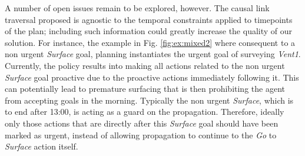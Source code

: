 A number of open issues remain to be explored, however. The causal
link traversal proposed is agnostic to the temporal constraints
applied to timepoints of the plan; including such information could
greatly increase the quality of our solution.  
For instance, the example in Fig. \ref{fig:ex:mixed2} where consequent 
to a non urgent {\em Surface} goal, planning instantiates the urgent
goal of surveying \emph{Vent1}. Currently, the policy results into making all
actions related to the non urgent {\em Surface} goal proactive due to the 
proactive actions immediately following it.
This can potentially lead to premature surfacing that is then
prohibiting the agent from accepting goals in the morning. Typically the
non urgent {\em Surface}, which is to end after 13:00, is acting as a
guard on the propagation.
Therefore, ideally only those actions that are directly after this
{\em Surface} goal should have been marked as urgent, instead of
allowing propagation to continue to the {\em Go} to {\em Surface} action itself.

